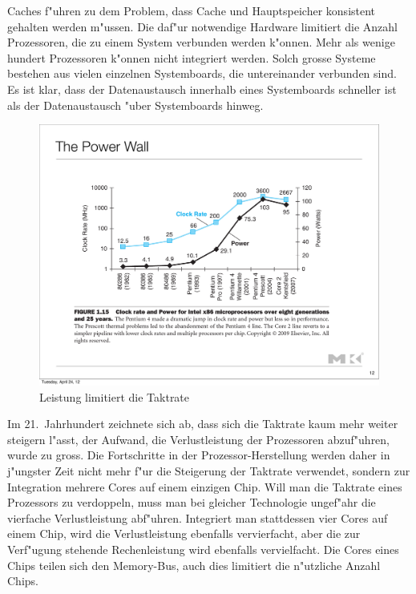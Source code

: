 Caches f"uhren zu dem Problem, dass Cache und Hauptspeicher konsistent
gehalten werden m"ussen. Die daf"ur notwendige Hardware limitiert die
Anzahl Prozessoren, die zu einem System verbunden werden k"onnen.
Mehr als wenige hundert Prozessoren k"onnen nicht integriert werden.
Solch grosse Systeme bestehen aus vielen einzelnen Systemboards, die
untereinander verbunden sind. Es ist klar, dass der Datenaustausch
innerhalb eines Systemboards schneller ist als der Datenaustausch
"uber Systemboards hinweg.

\begin{figure}
\begin{center}
\includegraphics[width=\hsize]{images/powerwall.pdf}
\end{center}
\caption{Leistung limitiert die Taktrate\label{powerwall}}
\end{figure}
Im 21.~Jahrhundert zeichnete sich ab, dass sich die Taktrate kaum mehr
weiter steigern l"asst, der Aufwand, die Verlustleistung der Prozessoren
abzuf"uhren, wurde zu gross.
Die Fortschritte in der Prozessor-Herstellung werden daher in 
j"ungster Zeit nicht mehr f"ur die Steigerung der Taktrate
verwendet, sondern zur Integration mehrere Cores auf einem
einzigen Chip.
Will man die Taktrate eines Prozessors zu verdoppeln, muss man
bei gleicher Technologie ungef"ahr
die vierfache Verlustleistung abf"uhren. Integriert man stattdessen
vier Cores auf einem Chip, wird die Verlustleistung ebenfalls 
vervierfacht, aber die zur Verf"ugung stehende Rechenleistung
wird ebenfalls vervielfacht. Die Cores eines Chips teilen sich
den Memory-Bus, auch dies limitiert die n"utzliche Anzahl Chips.

